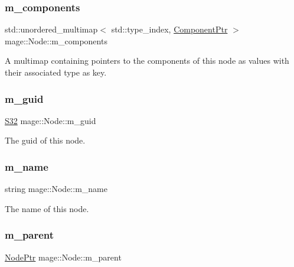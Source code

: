 \subsubsection{\texorpdfstring{m\+\_\+components}{m\_components}}
{\footnotesize\ttfamily std\+::unordered\+\_\+multimap$<$ std\+::type\+\_\+index, \hyperlink{classmage_1_1_node_a46b7e1f4f5b98bfa78ed96a80797a4ba}{Component\+Ptr} $>$ mage\+::\+Node\+::m\+\_\+components\hspace{0.3cm}{\ttfamily [private]}}

A multimap containing pointers to the components of this node as values with their associated type as key. \hypertarget{classmage_1_1_node_a1342131cdbad63e1eb068d22bc6f038d}{}\label{classmage_1_1_node_a1342131cdbad63e1eb068d22bc6f038d} 
\subsubsection{\texorpdfstring{m\+\_\+guid}{m\_guid}}
{\footnotesize\ttfamily \hyperlink{namespacemage_a642e05c5c83642b6946703615cdbf2da}{S32} mage\+::\+Node\+::m\+\_\+guid\hspace{0.3cm}{\ttfamily [private]}}

The guid of this node. \hypertarget{classmage_1_1_node_a476cc21fa65cdf9bde0f11fe08b5a707}{}\label{classmage_1_1_node_a476cc21fa65cdf9bde0f11fe08b5a707} 
\subsubsection{\texorpdfstring{m\+\_\+name}{m\_name}}
{\footnotesize\ttfamily string mage\+::\+Node\+::m\+\_\+name\hspace{0.3cm}{\ttfamily [private]}}

The name of this node. \hypertarget{classmage_1_1_node_aa04f166b52fca444c8756c0864a16cde}{}\label{classmage_1_1_node_aa04f166b52fca444c8756c0864a16cde} 
\subsubsection{\texorpdfstring{m\+\_\+parent}{m\_parent}}
{\footnotesize\ttfamily \hyperlink{classmage_1_1_node_ac575dc006e0ae1134277ade977dc06b6}{Node\+Ptr} mage\+::\+Node\+::m\+\_\+parent\hspace{0.3cm}{\ttfamily [private]}}

